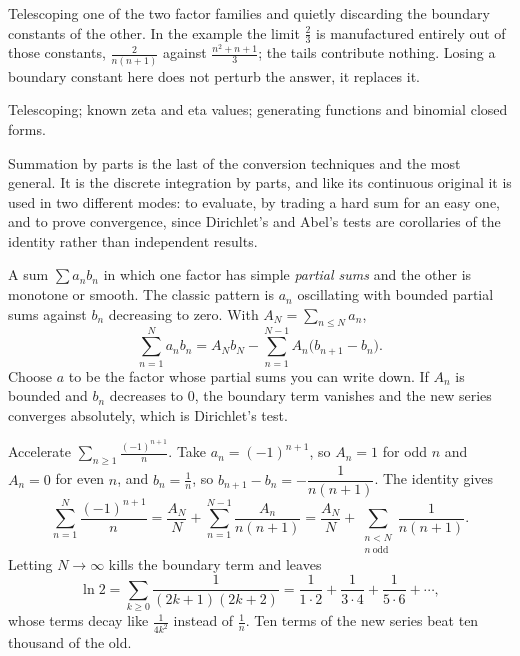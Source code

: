 \begin{trap}
Telescoping one of the two factor families and quietly discarding the boundary constants of the other. In the example the limit $\tfrac23$ is manufactured entirely out of those constants, $\tfrac{2}{n(n+1)}$ against $\tfrac{n^{2}+n+1}{3}$; the tails contribute nothing. Losing a boundary constant here does not perturb the answer, it replaces it.
\end{trap}

\begin{seealsob}Telescoping; known zeta and eta values; generating functions and binomial closed forms.\end{seealsob}

Summation by parts is the last of the conversion techniques and the most general. It is the discrete integration by parts, and like its continuous original it is used in two different modes: to evaluate, by trading a hard sum for an easy one, and to prove convergence, since Dirichlet's and Abel's tests are corollaries of the identity rather than independent results.

\cue A sum $\sum a_nb_n$ in which one factor has simple \emph{partial sums} and the other is monotone or smooth. The classic pattern is $a_n$ oscillating with bounded partial sums against $b_n$ decreasing to zero.
\method With $A_N=\sum_{n\leq N}a_n$,
\[\sum_{n=1}^{N}a_nb_n=A_Nb_N-\sum_{n=1}^{N-1}A_n\bigl(b_{n+1}-b_n\bigr).\]
Choose $a$ to be the factor whose partial sums you can write down. If $A_n$ is bounded and $b_n$ decreases to $0$, the boundary term vanishes and the new series converges absolutely, which is Dirichlet's test.

\begin{worked}
Accelerate $\displaystyle\sum_{n\geq1}\frac{(-1)^{n+1}}{n}$. Take $a_n=(-1)^{n+1}$, so $A_n=1$ for odd $n$ and $A_n=0$ for even $n$, and $b_n=\tfrac1n$, so $b_{n+1}-b_n=-\dfrac{1}{n(n+1)}$. The identity gives
\[\sum_{n=1}^{N}\frac{(-1)^{n+1}}{n}=\frac{A_N}{N}+\sum_{n=1}^{N-1}\frac{A_n}{n(n+1)}=\frac{A_N}{N}+\sum_{\substack{n<N\\ n\ \mathrm{odd}}}\frac{1}{n(n+1)}.\]
Letting $N\to\infty$ kills the boundary term and leaves
\[\ln2=\sum_{k\geq0}\frac{1}{(2k+1)(2k+2)}=\frac{1}{1\cdot2}+\frac{1}{3\cdot4}+\frac{1}{5\cdot6}+\cdots,\]
whose terms decay like $\tfrac{1}{4k^{2}}$ instead of $\tfrac1n$. Ten terms of the new series beat ten thousand of the old.
\end{worked}

